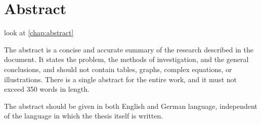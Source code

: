 %
%
%
%

\chapter*{Abstract}
\label{chap:abstract}

look at \ref{chap:abstract}

The abstract is a concise and accurate summary of the research described in the document. It states the problem, the methods of investigation, and the general conclusions, and should not contain tables, graphs, complex equations, or illustrations. There is a single abstract for the entire work, and it must not exceed 350 words in length.

The abstract should be given in both English and German language, independent of the language in which the thesis itself is written.



%

